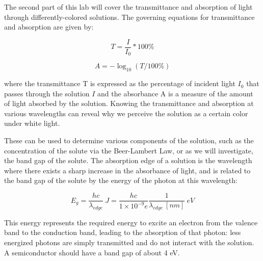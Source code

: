 The second part of this lab will cover the transmittance and absorption of light through differently-colored solutions. The governing equations for transmittance and absorption are given by:

\begin{equation}
   T = \frac{I}{I_0} * 100\%
\end{equation}

\begin{equation}
   A = -\log_{10}(T/100\%)
   \label{eq:absorbance}
\end{equation}

where the transmittance T is expressed as the percentage of incident light $I_0$ that passes through the solution $I$ and the absorbance A is a measure of the amount of light absorbed by the solution. Knowing the transmittance and absorption at various wavelengths can reveal why we perceive the solution as a certain color under white light.

These can be used to determine various components of the solution, such as the concentration of the solute via the Beer-Lambert Law, or as we will investigate, the band gap of the solute. The absorption edge of a solution is the wavelength where there exists a sharp increase in the absorbance of light, and is related to the band gap of the solute by the energy of the photon at this wavelength:

\begin{equation}
   E_g = \frac{hc}{\lambda_{edge}}~J = \frac{hc}{1\times10^{-9} e} \frac{1}{\lambda_{edge}~[nm]} ~eV
\end{equation}

This energy represents the required energy to excite an electron from the valence band to the conduction band, leading to the absorption of that photon: less energized photons are simply transmitted and do not interact with the solution. A semiconductor should have a band gap of about 4 eV. 